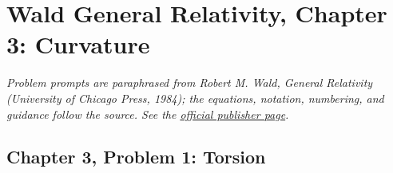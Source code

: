 \section{Wald General Relativity, Chapter 3: Curvature}

\noindent\textit{Problem prompts are paraphrased from Robert M. Wald,
\emph{General Relativity} (University of Chicago Press, 1984); the equations,
notation, numbering, and guidance follow the source. See the
\href{https://press.uchicago.edu/ucp/books/book/chicago/G/bo5952261.html}{official publisher page}.}

\subsection{Chapter 3, Problem 1: Torsion}


